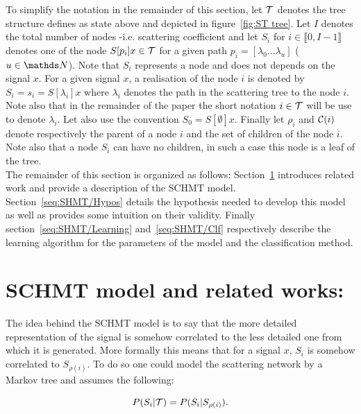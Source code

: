 \documentclass[a4paper,11pt]{report}
\begin{document}
{  To simplify the notation in the remainder of this section, let $\mathcal{T}$ denotes the tree  structure defines as state above and depicted in figure~\ref{fig:ST tree}. Let $I$ denotes the total number of nodes -i.e. scattering coefficient and let $S_{i}$ for $i \in \llbracket0, I-1 \rrbracket$ denotes one of the node $S[p_{i}]x \in \mathcal{T}$ for a given path $p_{i} = [\lambda_{0} ... \lambda_{u}]$ ($u\in \dsN$). Note that $S_{i}$ represents a node and does not depends on the signal $x$. For a given signal $x$, a realisation of the node $i$ is denoted by $S_{i}= s_{i} = S[\lambda_{i}]x$ where $\lambda_{i}$ denotes the path in the scattering tree to the node $i$. Note also that in the remainder of the paper the short notation $i \in \mathcal{T}$ will be use to denote $\lambda_{i}$. Let also use the convention $S_{0} = S[\emptyset]x$. Finally let $\rho_{i}$ and $\mathcal{C}(i)$ denote respectively the parent of a node $i$ and the set of children of the node $i$. Note also that a node $S_{i}$ can have no children, in such a case this node is a leaf of the tree.\\
  
  The remainder of this section is organized as follows: Section~\ref{seq:SHMT/Rel work} introduces related work and provide a description of the SCHMT model. Section~\ref{seq:SHMT/Hypos} details the hypothesis needed to develop this model as well as provides some intuition on their validity. Finally section~\ref{seq:SHMT/Learning} and~\ref{seq:SHMT/Clf} respectively describe the learning algorithm for the parameters of the model and the classification method.

  
  \section{SCHMT model and related works:}
    \label{seq:SHMT/Rel work}
      
    The idea behind the SCHMT model is to say that the more detailed representation of the signal is somehow correlated to the less detailed one from which it is generated. More formally this means that for a signal $x$, $S_{i}$ is somehow correlated to $S_{\rho(i)}$. To do so one could model the scattering network by a Markov tree and assumes the following:
    
    \begin{equation}
      P(S_{i} |\mathcal{T}) = P(S_{i} | S_{\rho(i)}).
      \label{eq:SMT - false hypo}
    \end{equation}\\

}
\end{document}
